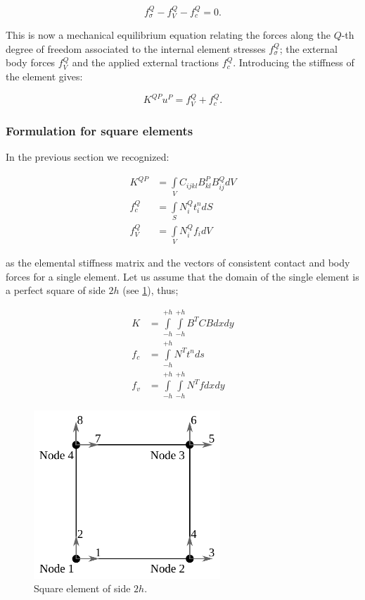 \begin{equation}
f_\sigma ^Q - f_V^Q - f_c^Q = 0.
\label{forces}
\end{equation}

This is now a mechanical equilibrium equation relating the forces along the $Q$-th degree of freedom associated to the internal element stresses $f_\sigma ^Q$; the external body forces $f_V^Q$ and the applied external tractions $f_c^Q$. Introducing the stiffness of the element gives:

\begin{equation}
K^{QP} u^P = f_V^Q + f_c^Q.
\label{Discreta}
\end{equation}

\subsubsection{Formulation for square elements}
In the previous section we recognized:

\begin{equation}
\begin{aligned}
{K^{QP}} & = \int\limits_V {{C_{ijkl}}B_{kl}^PB_{ij}^QdV} \\
f_c^Q    & = \int\limits_S {N_i^Qt_i^ndS} \\
f_V^Q    & = \int\limits_V {N_i^Q{f_i}dV}
\label{Rigi}
\end{aligned}
\end{equation}



as the elemental stiffness matrix and the vectors of consistent contact and body forces for a single element. Let us assume that the domain of the single element is a perfect square of side $2h$ (see \cref{fig:lado2h}), thus;

\begin{equation}
\begin{aligned}
K & = \int\limits_{ - h}^{ + h} {\int\limits_{ - h}^{ + h} {{B^T}CBdxdy} } \\
{f_c} & = \int\limits_{ - h}^{ + h} {{N^T}{t^n}ds} \\
{f_v} & = \int\limits_{ - h}^{ + h} {\int\limits_{ - h}^{ + h} {{N^T}fdxdy} }
\label{ele2}
\end{aligned}
\end{equation}

\begin{figure}[H]
\centering
\includegraphics[width=7cm]{lado2h.pdf}
\caption{Square element of side $2h$.}
\label{fig:lado2h}
\end{figure}


